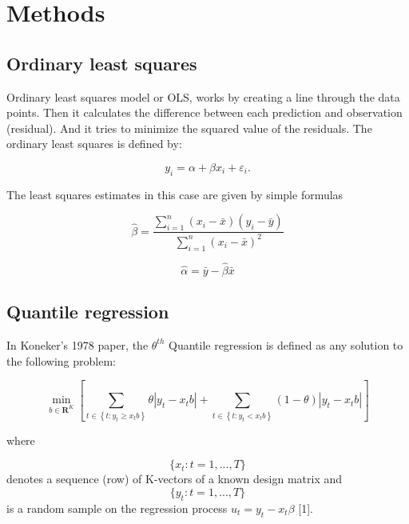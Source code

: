 \documentclass[
  letterpaper,
  DIV=11,
  numbers=noendperiod]{scrreprt}
\author{}
\date{}
\begin{document}
\ifdefined\Shaded\renewenvironment{Shaded}{\begin{tcolorbox}[breakable, sharp corners, borderline west={3pt}{0pt}{shadecolor}, boxrule=0pt, enhanced, frame hidden, interior hidden]}{\end{tcolorbox}}\fi

\hypertarget{methods}{%
\chapter{Methods}\label{methods}}

\hypertarget{ordinary-least-squares}{%
\section{Ordinary least squares}\label{ordinary-least-squares}}

Ordinary least squares model or OLS, works by creating a line through
the data points. Then it calculates the difference between each
prediction and observation (residual). And it tries to minimize the
squared value of the residuals. The ordinary least squares is defined
by:

\[
y_i=\alpha+\beta x_i+\varepsilon_i .
\]

The least squares estimates in this case are given by simple formulas

\[
\widehat{\beta} =\frac{\sum_{i=1}^n\left(x_i-\bar{x}\right)\left(y_i-\bar{y}\right)}{\sum_{i=1}^n\left(x_i-\bar{x}\right)^2}
\]

\[
\widehat{\alpha} =\bar{y}-\widehat{\beta} \bar{x}
\]

\hypertarget{quantile-regression}{%
\section{Quantile regression}\label{quantile-regression}}

In Koneker's 1978 paper, the \(\theta^{th}\) Quantile regression is
defined as any solution to the following problem:

\begin{equation}
\min _{b \in \mathbf{R}^K}\left[\sum_{t \in\left\{t: y_t \geqslant x_t b\right\}} \theta\left|y_t-x_t b\right|+\sum_{t \in\left\{t: y_t<x_t b\right\}}(1-\theta)\left|y_t-x_t b\right|\right] 
\end{equation}

where

\[
\{x_t: t=1,..., T\}
\] denotes a sequence (row) of K-vectors of a known design matrix and
\[\{y_t: t=1,..., T\}\] is a random sample on the regression process
\(u_t = y_t - x_t\beta\) {[}1{]}.
\end{document}
